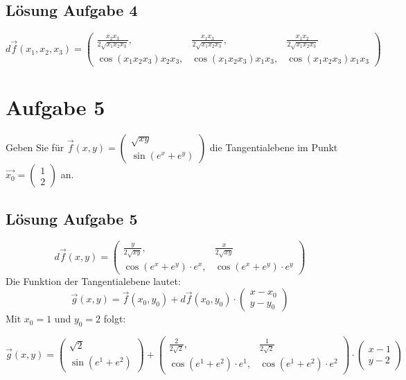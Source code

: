 \documentclass[ngerman, a4paper]{scrartcl}
\begin{document}
	\subsection*{Lösung Aufgabe 4}
	\[
	d\vec{f}(x_1, x_2, x_3) =
	\begin{pmatrix}
		\frac{x_2x_3}{2\sqrt{x_1x_2x_3}}, & \frac{x_1x_3}{2\sqrt{x_1x_2x_3}}, & \frac{x_1x_2}{2\sqrt{x_1x_2x_3}}\\
		\cos(x_1x_2x_3)x_2x_3, & \cos(x_1x_2x_3)x_1x_3, & \cos(x_1x_2x_3)x_1x_3
	\end{pmatrix}
	\]
	
	\section*{Aufgabe 5}
	Geben Sie für 
	$
	\vec{f}(x, y) = 
	\begin{pmatrix}
		\sqrt{xy}\\
		\sin(e^x + e^y)
	\end{pmatrix}
	$
	die Tangentialebene im Punkt 
	$
	\vec{x_0} = 
	\begin{pmatrix}
		1\\
		2
	\end{pmatrix}
	$
	an.
	
	\subsection*{Lösung Aufgabe 5}
	\[
		d\vec{f}(x, y) = 
		\begin{pmatrix}
			\frac{y}{2\sqrt{xy}}, & \frac{x}{2\sqrt{xy}}\\
			\cos(e^x + e^y) \cdot e^x, & \cos(e^x + e^y) \cdot e^y
		\end{pmatrix}
	\]
	Die Funktion der Tangentialebene lautet:
	\[
		\vec{g}(x, y) = \vec{f}(x_0, y_0) + d\vec{f}(x_0, y_0) \cdot
		\begin{pmatrix}
			x-x_0\\
			y-y_0
		\end{pmatrix}
	\]
	Mit $x_0 = 1 \text{ und } y_0 = 2$ folgt:
	
	\[
		\vec{g}(x, y) =
		\begin{pmatrix}
			\sqrt{2}\\
			\sin(e^1 + e^2)
		\end{pmatrix}
		+
		\begin{pmatrix}
			\frac{2}{2\sqrt{2}}, & \frac{1}{2\sqrt{2}}\\
			\cos(e^1 + e^2) \cdot e^1, & \cos(e^1 + e^2) \cdot e^2
		\end{pmatrix}
		\cdot
		\begin{pmatrix}
			x-1\\
			y-2
		\end{pmatrix}
	\]
	
\end{document}
